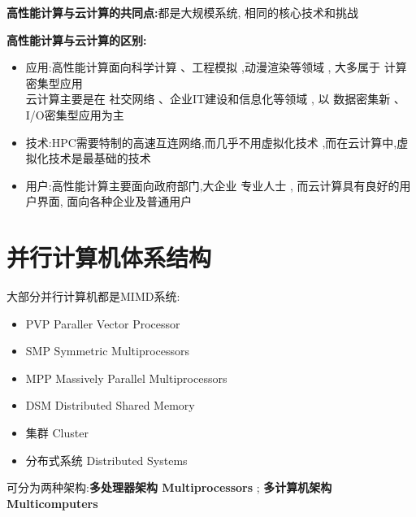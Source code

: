 \documentclass[UTF8,a4paper]{ctexart}
\newcommand{\spaceline}{\vspace{\baselineskip}}
\begin{document}
  \textbf{高性能计算与云计算的共同点:}都是大规模系统, 相同的核心技术和挑战

  \textbf{高性能计算与云计算的区别:}
  \begin{itemize}
    \item 应用:高性能计算面向科学计算 、工程模拟 ,动漫渲染等领域 , 大多属于 计算密集型应用
    \\云计算主要是在 社交网络 、企业IT建设和信息化等领域 , 以 数据密集新 、 I/O密集型应用为主
    \item 技术:HPC需要特制的高速互连网络,而几乎不用虚拟化技术 ,而在云计算中,虚拟化技术是最基础的技术
    \item 用户:高性能计算主要面向政府部门,大企业 专业人士 , 而云计算具有良好的用户界面, 面向各种企业及普通用户
  \end{itemize}

  \section{并行计算机体系结构}
  大部分并行计算机都是MIMD系统:
  \begin{itemize}
    \item PVP Paraller Vector Processor
    \item SMP Symmetric Multiprocessors
    \item MPP Massively Parallel Multiprocessors
    \item DSM Distributed Shared Memory
    \item 集群 Cluster
    \item 分布式系统 Distributed Systems
  \end{itemize}

  可分为两种架构:\textbf{多处理器架构 Multiprocessors} ; \textbf{多计算机架构 Multicomputers}
\end{document}
